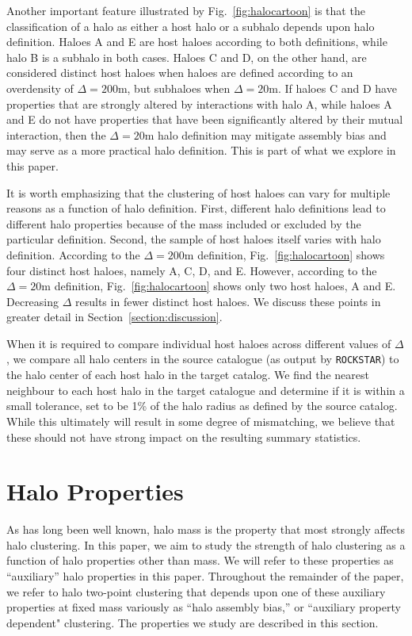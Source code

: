 \documentclass[usenatbib,fleqn]{mnras}
\begin{document}
Another important feature illustrated by Fig.~\ref{fig:halocartoon} is that the classification of a halo as either a host halo or a subhalo depends upon halo definition. Haloes A and E are host haloes according to both definitions, while halo B is a subhalo in
both cases. Haloes C and D, on the other hand, are considered distinct host haloes when haloes are defined according to an overdensity of $\Delta=200$m, but subhaloes when $\Delta=20$m. If haloes C and D have properties that are strongly altered by interactions with halo A, while haloes A and E do not have properties that have been significantly altered by their mutual interaction, then the $\Delta=20$m halo definition may mitigate assembly bias and may serve as a more practical halo definition. This is part of what we explore in this paper.

It is worth emphasizing that the clustering of host haloes can vary for multiple reasons as a function of halo definition. First, different halo definitions lead to different halo properties because of the mass included or excluded by the particular definition. Second, the sample of host haloes itself varies with halo definition. According to the $\Delta=200$m definition, Fig.~\ref{fig:halocartoon} shows four distinct host haloes, namely A, C, D, and E. However, according to the $\Delta=20$m definition, Fig.~\ref{fig:halocartoon} shows only two host haloes, A and E. Decreasing $\Delta$ results in fewer distinct host haloes. We discuss these points in greater detail in Section~\ref{section:discussion}.

When it is required to compare individual host haloes across different values of $\Delta$, we compare all halo centers in the source catalogue (as output by {\tt ROCKSTAR}) to the halo center of each host halo in the target catalog. We find the nearest neighbour to each host halo in the target catalogue and determine if it is within a small tolerance, set to be 1\% of the halo radius as defined by the source catalog. While this ultimately will result in some degree of mismatching, we believe that these should not have strong impact on the resulting summary statistics.


\section{Halo Properties}
\label{section:haloprops}

As has long been well known, halo mass is the property that most strongly affects halo clustering. In this paper, we aim to study the strength of halo clustering as a function of halo properties other than mass. We will refer to these properties as ``auxiliary'' halo properties in this paper. Throughout the remainder of the paper, we refer to halo two-point clustering that depends upon one of these auxiliary properties at fixed mass variously as ``halo assembly bias,'' or ``auxiliary property dependent" clustering. The properties we study are described in this section.
\end{document}
